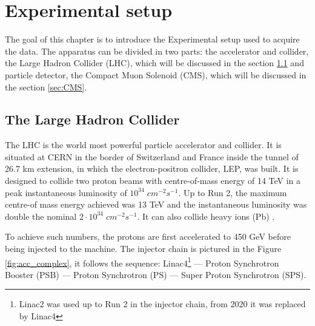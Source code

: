 \chapter{Experimental setup}

The goal of this chapter is to introduce the Experimental setup used to acquire the data. The apparatus can be divided in two parts: the accelerator and collider, the Large Hadron Collider (LHC), which will be discussed in the section \ref{sec:LHC} and particle detector, the Compact Muon Solenoid (CMS), which will be discussed in the section \ref{sec:CMS}.

\section{The Large Hadron Collider}\label{sec:LHC}

The LHC is the world most powerful particle accelerator and collider. It is  situated at CERN in the border of Switzerland and France inside the tunnel of 26.7 km extension, in which the electron-positron collider, LEP, was built. It is designed to collide two proton beams with centre-of-mass energy of 14 TeV in a peak instantaneous luminosity of $10^{34} \; cm^{-2} s^{-1}$. Up to Run 2, the maximum centre-of mass energy achieved was 13 TeV and the instantaneous luminosity was double the nominal $2 \cdot 10^{34} \; cm^{-2} s^{-1}$. It can also collide heavy ions (Pb) \cite{Evans_2008}.

To achieve such numbers, the protons are first accelerated to 450 GeV before being injected to the machine. The injector chain is pictured in the Figure \ref{fig:acc_complex}, it follows the sequence: Linac4\footnote{Linac2 was used up to Run 2 in the injector chain, from 2020 it was replaced by Linac4} — Proton Synchrotron Booster (PSB) — Proton Synchrotron (PS) — Super Proton Synchrotron (SPS). 

